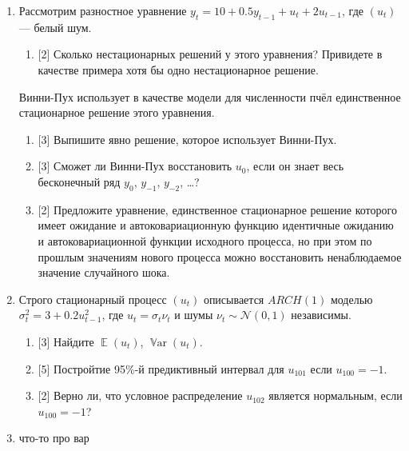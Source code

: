 \documentclass[12pt]{article}
\DeclareMathOperator{\Var}{\mathbb{V}ar}
\DeclareMathOperator{\E}{\mathbb{E}}
\newcommand{\cN}{\mathcal{N}}
\begin{document}
\begin{enumerate}
    \item Рассмотрим разностное уравнение $y_t = 10 + 0.5 y_{t-1} + u_{t} + 2 u_{t-1}$, где $(u_t)$ — белый шум. 
    \begin{enumerate}
        \item {[2]} Сколько нестационарных решений у этого уравнения? Привидете в качестве примера хотя бы одно нестационарное решение. 
    \end{enumerate}
    Винни-Пух использует в качестве модели для численности пчёл единственное стационарное решение этого уравнения. 
    \begin{enumerate}[resume]
        \item {[3]} Выпишите явно решение, которое использует Винни-Пух. 
        \item {[3]} Сможет ли Винни-Пух восстановить $u_0$, если он знает весь бесконечный ряд $y_0$, $y_{-1}$, $y_{-2}$, \dots?
        \item {[2]} Предложите уравнение, единственное стационарное решение которого имеет ожидание и автоковариационную функцию идентичные ожиданию и автоковариационной функции исходного процесса,
        но при этом по прошлым значениям нового процесса можно восстановить ненаблюдаемое значение случайного шока. 
    \end{enumerate}

    \item   Строго стационарный процесс $(u_t)$ описывается $ARCH(1)$ моделью $\sigma^2_t = 3 + 0.2 u_{t-1}^2$, где 
    $u_t = \sigma_t \nu_t$ и шумы $\nu_t \sim \cN(0, 1)$ независимы.
    \begin{enumerate}
        \item {[3]} Найдите $\E(u_t)$, $\Var(u_t)$.
        \item {[5]} Постройтие 95\%-й предиктивный интервал для $u_{101}$ если $u_{100} = -1$.
        \item {[2]} Верно ли, что условное распределение $u_{102}$ является нормальным, если $u_{100} = -1$?
    \end{enumerate}

    \item что-то про вар

\end{enumerate}
\end{document}
